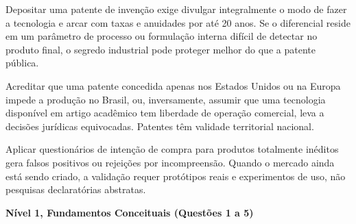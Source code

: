\begin{boxErro}
  Depositar uma patente de invenção exige divulgar integralmente o modo de fazer a tecnologia e arcar com taxas e anuidades por até 20 anos. Se o diferencial reside em um parâmetro de processo ou formulação interna difícil de detectar no produto final, o segredo industrial pode proteger melhor do que a patente pública.
\end{boxErro}

\begin{boxErro}
  Acreditar que uma patente concedida apenas nos Estados Unidos ou na Europa impede a produção no Brasil, ou, inversamente, assumir que uma tecnologia disponível em artigo acadêmico tem liberdade de operação comercial, leva a decisões jurídicas equivocadas. Patentes têm validade territorial nacional.
\end{boxErro}

\begin{boxErro}
  Aplicar questionários de intenção de compra para produtos totalmente inéditos gera falsos positivos ou rejeições por incompreensão. Quando o mercado ainda está sendo criado, a validação requer protótipos reais e experimentos de uso, não pesquisas declaratórias abstratas.
\end{boxErro}


\textbf{Nível 1, Fundamentos Conceituais (Questões 1 a 5)}

